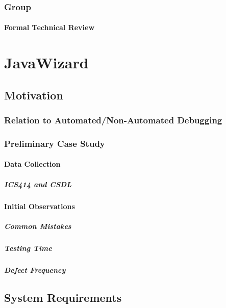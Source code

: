 \subsection{Group}
\subsubsection{Formal Technical Review}

\chapter{JavaWizard}

\section{Motivation}
\subsection{Relation to Automated/Non-Automated Debugging}
\subsection{Preliminary Case Study}
\subsubsection{Data Collection}
\paragraph{ICS414 and CSDL}
\subsubsection{Initial Observations}
\paragraph{Common Mistakes}
\paragraph{Testing Time}
\paragraph{Defect Frequency}

\section{System Requirements}
